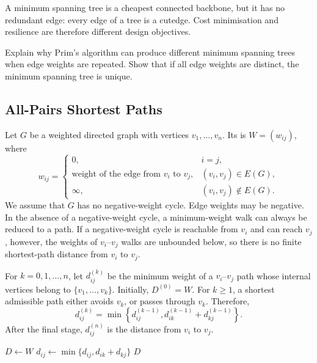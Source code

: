 \begin{Remark*}
A minimum spanning tree is a cheapest connected backbone, but it has no redundant edge: every edge of a tree is a cutedge. Cost minimisation and resilience are therefore different design objectives.
\end{Remark*}

\begin{Exercise}
Explain why Prim's algorithm can produce different minimum spanning trees when edge weights are repeated. Show that if all edge weights are distinct, the minimum spanning tree is unique.
\end{Exercise}

\subsection{All-Pairs Shortest Paths}\label{subsec:AllPairs}

Let $G$ be a weighted directed graph with vertices $v_1,\ldots,v_n$. Its  is $W=(w_{ij})$, where
\begin{equation*}
w_{ij}=
\begin{cases}
0, & i=j,\\
\text{weight of the edge from $v_i$ to $v_j$}, & (v_i,v_j)\in E(G),\\
\infty, & (v_i,v_j)\notin E(G).
\end{cases}
\end{equation*}
We assume that $G$ has no negative-weight cycle. Edge weights may be negative. In the absence of a negative-weight cycle, a minimum-weight walk can always be reduced to a path. If a negative-weight cycle is reachable from $v_i$ and can reach $v_j$, however, the weights of $v_i$--$v_j$ walks are unbounded below, so there is no finite shortest-path distance from $v_i$ to $v_j$.

For $k=0,1,\ldots,n$, let $d_{ij}^{(k)}$ be the minimum weight of a $v_i$--$v_j$ path whose internal vertices belong to $\{v_1,\ldots,v_k\}$. Initially, $D^{(0)}=W$. For $k\ge1$, a shortest admissible path either avoids $v_k$, or passes through $v_k$. Therefore,
\begin{equation*}
    d_{ij}^{(k)}=\min\left\{d_{ij}^{(k-1)},
    d_{ik}^{(k-1)}+d_{kj}^{(k-1)}\right\}.
\end{equation*}
After the final stage, $d_{ij}^{(n)}$ is the distance from $v_i$ to $v_j$.

\begin{algorithm}[H]\caption{Floyd--Warshall algorithm}\label{alg:FloydWarshall}
\begin{algorithmic}[1]
\State $D\gets W$
            \State $d_{ij}\gets\min\{d_{ij},d_{ik}+d_{kj}\}$
        \EndFor
    \EndFor
\EndFor
\State \Return $D$
\end{algorithmic}
\end{algorithm}

